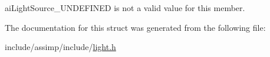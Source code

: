 ai\-Light\-Source\-\_\-\-U\-N\-D\-E\-F\-I\-N\-E\-D is not a valid value for this member. 

The documentation for this struct was generated from the following file\-:\begin{DoxyCompactItemize}
\item 
include/assimp/include/\hyperlink{include_2assimp_2include_2light_8h}{light.\-h}\end{DoxyCompactItemize}

